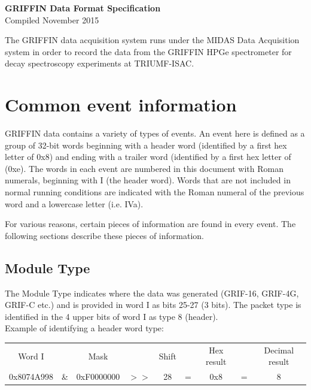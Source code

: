 \documentclass[letterpaper,12pt,notitlepage]{report}
\makeatletter
\newcommand*{\toccontents}{\@starttoc{toc}}
\makeatother
\begin{document}
\topmargin -2.0cm
\textwidth 20.0cm
\textheight 23.0cm

\begin{center}
\thispagestyle{empty}
{\large {\bf GRIFFIN Data Format Specification}}\\
Compiled November 2015
\end{center}

The GRIFFIN data acquisition system runs under the MIDAS Data Acquisition system in order to record the data from the GRIFFIN HPGe spectrometer for decay spectroscopy experiments at TRIUMF-ISAC.\\

\toccontents

\chapter{Common event information}

GRIFFIN data contains a variety of types of events. An event here is defined as a group of 32-bit words beginning with a header word (identified by a first hex letter of 0x8) and ending with a trailer word (identified by a first hex letter of (0xe). The words in each event are numbered in this document with Roman numerals, beginning with I (the header word). Words that are not included in normal running conditions are indicated with the Roman numeral of the previous word and a lowercase letter (i.e. IVa).

For various reasons, certain pieces of information are found in every event. The following sections describe these pieces of information.

\section{Module Type}
The Module Type indicates where the data was generated (GRIF-16, GRIF-4G, GRIF-C etc.) and is provided in word I as bits 25-27 (3 bits). The packet type is identified in the 4 upper bits of word I as type 8 (header).\\

Example of identifying a header word type:\\

\begin{tabular}{ccccccccc}
Word I &  & Mask & & Shift & & Hex result & & Decimal result\\
0x8074A998 & \& & 0xF0000000 & $>>$ & 28 & = & 0x8 & = & 8\\
\end{tabular}\\
\end{document}
